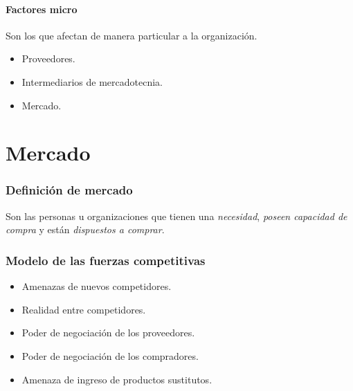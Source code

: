 \documentclass[12pt, spanish, a5paper]{article}
\begin{document}
\subsection{Factores micro}

Son los que afectan de manera particular a la organización.

\begin{itemize}
	\item Proveedores.
	\item Intermediarios de mercadotecnia.
	\item Mercado.
\end{itemize}


\part{Mercado}


\section{Definición de mercado}
Son las personas u organizaciones que tienen una \emph{necesidad}, \emph{poseen capacidad de compra} y están \emph{dispuestos a comprar}.


\section{Modelo de las fuerzas competitivas}

\begin{itemize}
	\item Amenazas de nuevos competidores.
	\item Realidad entre competidores.
	\item Poder de negociación de los proveedores.
	\item Poder de negociación de los compradores.
	\item Amenaza de ingreso de productos sustitutos.
\end{itemize}
\end{document}
